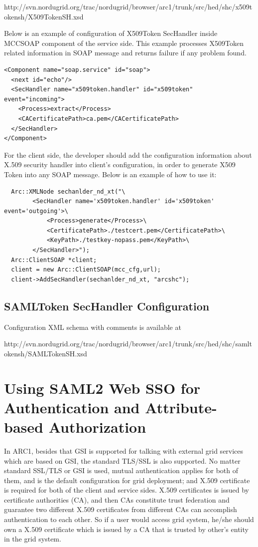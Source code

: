 \documentclass{article}                            %
\begin{document}
http://svn.nordugrid.org/trac/nordugrid/browser/arc1/trunk/src/hed/shc/x509tokensh/X509TokenSH.xsd

Below is an example of configuration of X509Token SecHandler inside MCCSOAP component of the service side. This example processes X509Token related information in SOAP message and returns failure if any problem found.

\begin{verbatim}
<Component name="soap.service" id="soap">
  <next id="echo"/>
  <SecHandler name="x509token.handler" id="x509token" event="incoming">
    <Process>extract</Process>
    <CACertificatePath>ca.pem</CACertificatePath>
  </SecHandler>
</Component>
\end{verbatim}

For the client side, the developer should add the configuration information about X.509 security handler into client's configuration, in order to generate X509 Token into any SOAP message. Below is an example of how to use it:

\begin{verbatim}
  Arc::XMLNode sechanlder_nd_xt("\
        <SecHandler name='x509token.handler' id='x509token' event='outgoing'>\
            <Process>generate</Process>\
            <CertificatePath>./testcert.pem</CertificatePath>\
            <KeyPath>./testkey-nopass.pem</KeyPath>\
        </SecHandler>");
  Arc::ClientSOAP *client;
  client = new Arc::ClientSOAP(mcc_cfg,url);
  client->AddSecHandler(sechanlder_nd_xt, "arcshc");
\end{verbatim}


\subsection{SAMLToken SecHandler Configuration} %
\label{subsec:st_sechandler_conf}
Configuration XML schema with comments is available at

http://svn.nordugrid.org/trac/nordugrid/browser/arc1/trunk/src/hed/shc/samltokensh/SAMLTokenSH.xsd



\section{Using SAML2 Web SSO for Authentication and Attribute-based Authorization} %
\label{sec:samlsso}
   In ARC1, besides that GSI is supported for talking with external grid services which are based on GSI, the standard TLS/SSL is also supported. No matter standard SSL/TLS or GSI is used, mutual authentication applies for both of them, and is the default configuration for grid deployment; and X.509 certificate is required for both of the client and service sides. X.509 certificates is issued by certificate authorities (CA), and then CAs constitute trust federation and guarantee two different X.509 certificates from different CAs can accomplish authentication to each other. So if a user would access grid system, he/she should own a X.509 certificate which is issued by a CA that is trusted by other's entity in the grid system.
\end{document}

